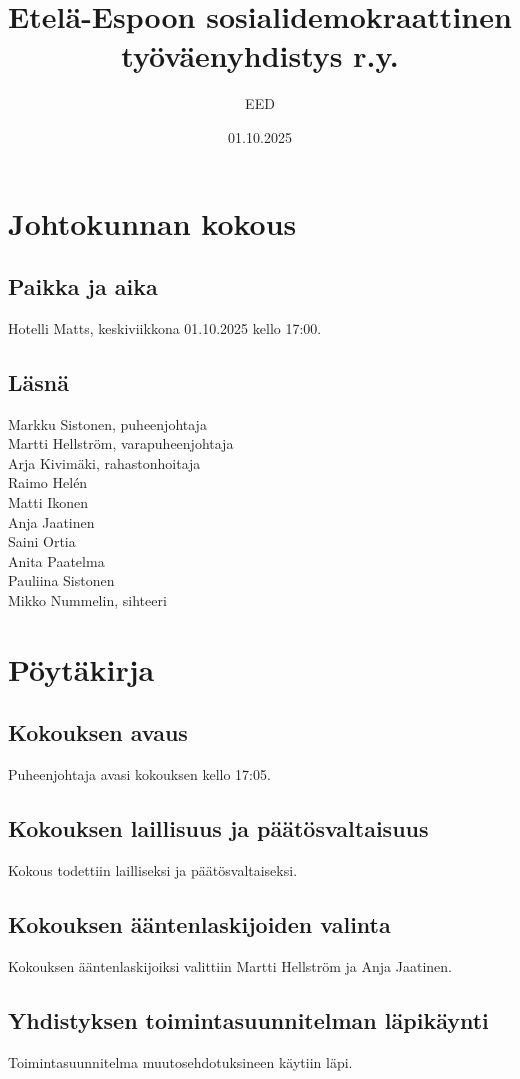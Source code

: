 \documentclass[a4paper,12pt]{article}
\title{Etelä-Espoon sosialidemokraattinen työväenyhdistys r.y.}
\author{EED}
\date{01.10.2025}
\begin{document}
\maketitle
\tableofcontents
\section*{Johtokunnan kokous}
\subsection*{Paikka ja aika}
Hotelli Matts, keskiviikkona 01.10.2025 kello 17:00.
\subsection*{Läsnä}
Markku Sistonen, puheenjohtaja \\
Martti Hellström, varapuheenjohtaja \\
Arja Kivimäki, rahastonhoitaja \\
Raimo Helén \\
Matti Ikonen \\
Anja Jaatinen \\
Saini Ortia \\
Anita Paatelma \\
Pauliina Sistonen \\
Mikko Nummelin, sihteeri
\section*{Pöytäkirja}
\subsection{Kokouksen avaus}
Puheenjohtaja avasi kokouksen kello 17:05.
\subsection{Kokouksen laillisuus ja päätösvaltaisuus}
Kokous todettiin lailliseksi ja päätösvaltaiseksi.
\subsection{Kokouksen ääntenlaskijoiden valinta}
Kokouksen ääntenlaskijoiksi valittiin Martti Hellström ja Anja Jaatinen.
\subsection{Yhdistyksen toimintasuunnitelman läpikäynti}
Toimintasuunnitelma muutosehdotuksineen käytiin läpi.
\end{document}
